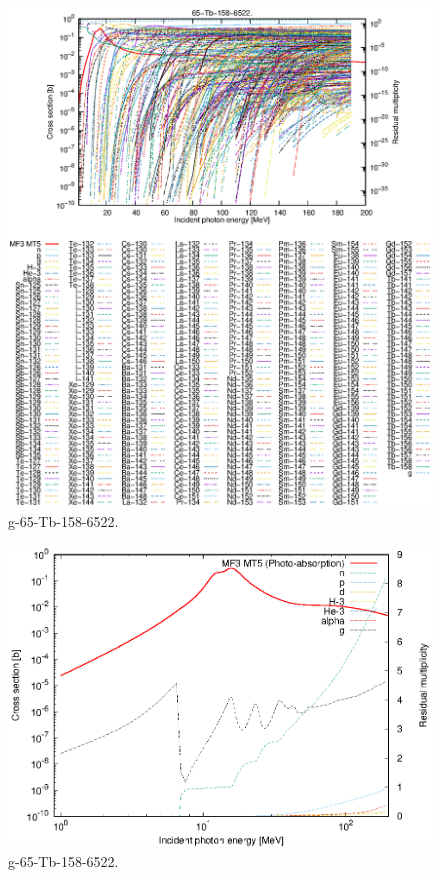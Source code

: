 \begin{figure}
 \includegraphics[width=\linewidth]{eps/g_65-Tb-158_6522.eps}
  \caption{g-65-Tb-158-6522.}
\end{figure}
\newpage \clearpage

\begin{figure}
 \includegraphics[width=\linewidth]{eps-log/g_65-Tb-158_6522.eps}
 \caption{g-65-Tb-158-6522.}
\end{figure}
\newpage \clearpage

